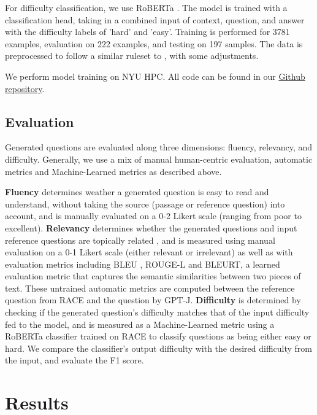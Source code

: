 \documentclass[11pt]{article}
\begin{document}
For difficulty classification, we use RoBERTa \citep{roberta:12}. The model is trained with a classification head, taking in a combined input of context, question, and answer with the difficulty labels of 'hard' and 'easy'. Training is performed for 3781 examples, evaluation on 222 examples, and testing on 197 samples. The data is preprocessed to follow a similar ruleset to \citet{Difficulty:3}, with some adjustments.

We perform model training on NYU HPC. All code can be found in our \href{https://github.com/rbolline/Neural-Question-Generation-with-GPT-J}{Github repository}. 


\subsection{Evaluation}

Generated questions are evaluated along three dimensions: fluency, relevancy, and difficulty. Generally, we use a mix of manual human-centric evaluation, automatic metrics and Machine-Learned metrics as described above.

\textbf{Fluency} determines weather a generated question is easy to read and understand, without taking the source (passage or reference question) into account, and is manually evaluated on a 0-2 Likert scale (ranging from poor to excellent). \textbf{Relevancy} determines whether the generated questions and input reference questions are topically related \citep{relevancy:14}, and is measured using manual evaluation on a 0-1 Likert scale (either relevant or irrelevant) as well as with evaluation metrics including BLEU \citep{BLEU:6}, ROUGE-L \citep{rouge:5} and BLEURT, \citep{bleurt:7} a learned evaluation metric that captures the semantic similarities between two pieces of text. These untrained automatic metrics are computed between the reference question from RACE and the question by GPT-J. \textbf{Difficulty} is determined by checking if the generated question’s difficulty matches that of the input difficulty fed to the model, and is measured as a Machine-Learned metric using a RoBERTa \citep{roberta:12} classifier trained on RACE to classify questions as being either easy or hard. We compare the classifier's output difficulty with the desired difficulty from the input, and evaluate the F1 score.  

\section{Results}
\end{document}
